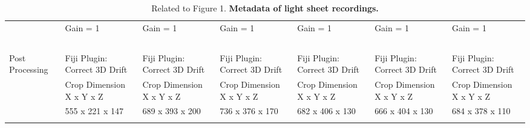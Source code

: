 \begin{sidewaystable}[!ht]
\begin{longtable}{@{} l l l l l l l @{}}
& Gain = 1 & Gain = 1 & Gain = 1 & Gain = 1 & Gain = 1 & Gain = 1\\
& \ & \ & \ & \ & \ & \ \\
Post Processing & Fiji Plugin: Correct 3D Drift & Fiji Plugin: Correct 3D Drift & Fiji Plugin: Correct 3D Drift & Fiji Plugin: Correct 3D Drift & Fiji Plugin: Correct 3D Drift & Fiji Plugin: Correct 3D Drift\\
& Crop Dimension X x Y x Z & Crop Dimension X x Y x Z & Crop Dimension X x Y x Z & Crop Dimension X x Y x Z & Crop Dimension X x Y x Z & Crop Dimension X x Y x Z\\
& 555 x 221 x 147 & 689 x 393 x 200 & 736 x 376 x 170 & 682 x 406 x 130 & 666 x 404 x 130 & 684 x 378 x 110\\
\bottomrule
\caption[Metadata of light sheet recordings.]{Related to Figure 1. \textbf{Metadata of light sheet recordings.}}
\label{tab:metadata}
\end{longtable}
\end{sidewaystable}
%

